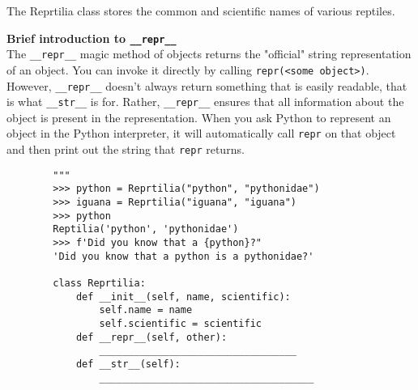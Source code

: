 \begin{blocksection}
    \question The Reprtilia class stores the common and scientific names of various reptiles.
    
    \textbf{Brief introduction to \lstinline{__repr__}} \\ The \lstinline{__repr__} magic method of objects returns the "official" string representation of an object. You can invoke it directly by calling \lstinline{repr(<some object>)}. However, \lstinline{__repr__} doesn't always return something that is easily readable, that is what \lstinline{__str__} is for. Rather, \lstinline{__repr__} ensures that all information about the object is present in the representation. When you ask Python to represent an object in the Python interpreter, it will automatically call \lstinline{repr} on that object and then print out the string that \lstinline{repr} returns.
    
    \vspace{1.5\baselineskip}
    
    \begin{lstlisting}
        """
        >>> python = Reprtilia("python", "pythonidae")
        >>> iguana = Reprtilia("iguana", "iguana")
        >>> python
        Reptilia('python', 'pythonidae')
        >>> f'Did you know that a {python}?"
        'Did you know that a python is a pythonidae?'
    
        class Reprtilia:
            def __init__(self, name, scientific):
                self.name = name
                self.scientific = scientific
            def __repr__(self, other):
                __________________________________
            def __str__(self):
                _____________________________________
    \end{lstlisting}
    \end{blocksection}
    
